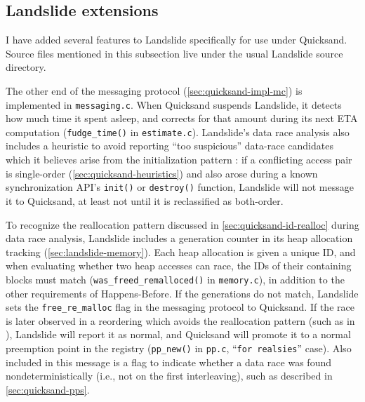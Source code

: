 \subsection{Landslide extensions}
\label{sec:quicksand-impl-landslide}

I have added several features to Landslide specifically for use under Quicksand.
Source files mentioned in this subsection live under the usual Landslide source directory.

The other end of the messaging protocol (\cref{sec:quicksand-impl-mc})
is implemented in {\tt messaging.c}.
When Quicksand suspends Landslide,
it detects how much time it spent asleep,
and corrects for that amount during its next ETA computation ({\tt fudge\_time()} in {\tt estimate.c}).
Landslide's data race analysis also includes a heuristic to avoid reporting ``too suspicious''
data-race candidates which it believes arise from the initialization pattern \cite{eraser}:
if a conflicting access pair is single-order (\cref{sec:quicksand-heuristics})
and also arose during a known synchronization API's {\tt init()} or {\tt destroy()} function,
Landslide will not message it to Quicksand,
at least not until it is reclassified as both-order.

To recognize the reallocation pattern
discussed in \cref{sec:quicksand-id-realloc}
during data race analysis,
Landslide includes a generation counter in its heap allocation tracking (\cref{sec:landslide-memory}).
Each heap allocation is given a unique ID,
and when evaluating whether two heap accesses can race,
the IDs of their containing blocks must match
({\tt was\_freed\_remalloced()} in {\tt memory.c}),
in addition to the other requirements of Happens-Before.
If the generations do not match,
Landslide sets the {\tt free\_re\_malloc} flag in the messaging protocol to Quicksand.
If the race is later observed in a reordering which avoids the reallocation pattern
(such as in ),
Landslide will report it as normal,
and Quicksand will promote it to a normal preemption point in the registry
({\tt pp\_new()} in {\tt pp.c}, ``{\tt for realsies}'' case).
Also included in this message is a flag to indicate whether a data race was found
nondeterministically (i.e., not on the first interleaving), such as described in \cref{sec:quicksand-pps}.

